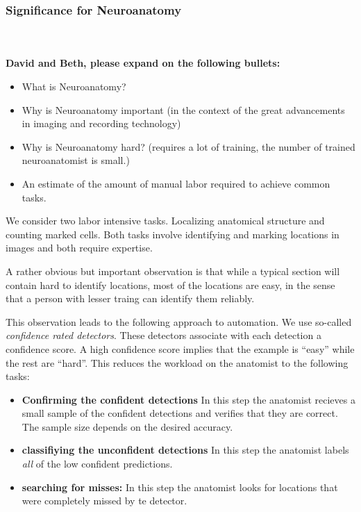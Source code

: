 \documentclass[runningheads]{llncs}
\begin{document}
\subsubsection {Significance for Neuroanatomy}
~\\ ~\\
{\bf David and Beth, please expand on the following bullets:}
\begin{itemize}
\item What is Neuroanatomy?
  \item Why is Neuroanatomy important (in the context of the great
    advancements in imaging and recording technology)
\item Why is Neuroanatomy hard? (requires a lot of training, the
  number of trained neuroanatomist is small.)
\item An estimate of the amount of manual labor required to achieve
  common tasks.
\end{itemize}


We consider two labor intensive tasks. Localizing anatomical structure
and counting marked cells. Both tasks involve identifying and marking
locations in images and both require expertise.

A rather obvious but important observation is that while a typical
section will contain hard to identify locations, most of the locations
are easy, in the sense that a person with lesser traing can identify
them reliably.

This observation leads to the following approach to automation. We
use so-called {\em confidence rated detectors}. These detectors
associate with each detection a confidence score. A high confidence
score implies that the example is ``easy''  while the rest are
``hard''. This reduces the workload on the anatomist to the following
tasks:
\begin{itemize}
  \item {\bf Confirming the confident detections} In this step the
    anatomist recieves a small sample of the confident detections and
    verifies that they are correct. The sample size depends on the
    desired accuracy.
    \item {\bf classifiying the unconfident detections} In this step
      the anatomist labels {\em all} of the low confident predictions.
    \item {\bf searching for misses:} In this step the anatomist looks
      for locations that were completely missed by te detector.
  \end{itemize}
\end{document}
